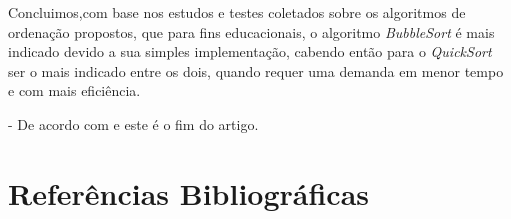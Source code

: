 \documentclass[a4paper,10pt]{article}  %
\begin{document}
    Concluimos,com base nos estudos e testes coletados sobre os algoritmos de ordenação propostos, que para fins educacionais, o algoritmo \textit{BubbleSort} é mais indicado devido a sua simples implementação, cabendo então para o \textit{QuickSort} ser o mais indicado entre os dois, quando requer uma demanda em menor tempo e com mais eficiência.

- De acordo com \cite{Benante2008phd} e este é o fim do artigo.


\section*{Referências Bibliográficas}

\nocite{*}


%



\end{document}
